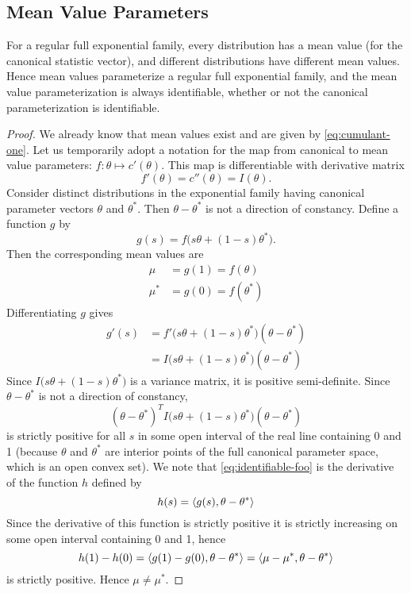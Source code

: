\subsection{Mean Value Parameters}
\label{sec:mean-value-parameterization}

\begin{theorem} \label{th:mean-value}
For a regular full exponential family, every distribution has a mean
value (for the canonical statistic vector), and different distributions
have different mean values.  Hence mean values parameterize a regular
full exponential family, and the mean value parameterization is always
identifiable, whether or not the canonical parameterization is identifiable.
\end{theorem}
\begin{proof}
We already know that mean values exist and are given by \eqref{eq:cumulant-one}.
Let us temporarily adopt a notation for the map from canonical to mean value
parameters: $f : \theta \mapsto c'(\theta)$.
This map is differentiable with derivative matrix
$$
   f'(\theta) = c''(\theta) = I(\theta).
$$
Consider distinct distributions in the exponential family having
canonical parameter vectors $\theta$ and $\theta^*$.
Then $\theta - \theta^*$ is not a direction of constancy.
Define a function $g$ by
$$
   g(s) = f\bigl(s \theta + (1 - s) \theta^*\bigr).
$$
Then the corresponding mean values are
\begin{align*}
   \mu & = g(1) = f(\theta)
   \\
   \mu^* & = g(0) = f(\theta^*)
\end{align*}
Differentiating $g$ gives
\begin{align*}
   g'(s)
   & =
   f'\bigl(s \theta + (1 - s) \theta^*\bigr) (\theta - \theta^*)
   \\
   & =
   I\bigl(s \theta + (1 - s) \theta^*\bigr) (\theta - \theta^*)
\end{align*}
Since $I\bigl(s \theta + (1 - s) \theta^*\bigr)$ is a variance matrix,
it is positive semi-definite.
Since $\theta - \theta^*$ is not a direction of constancy,
\begin{equation} \label{eq:identifiable-foo}
   (\theta - \theta^*)^T
   I\bigl(s \theta + (1 - s) \theta^*\bigr) (\theta - \theta^*)
\end{equation}
is strictly positive for all $s$ in some open interval of the real line
containing 0 and 1 (because $\theta$ and $\theta^*$ are interior points
of the full canonical parameter space, which is an open convex set).
We note that \eqref{eq:identifiable-foo} is the
derivative of the function $h$ defined by
$$
   h(s) = \langle g(s), \theta - \theta^* \rangle
$$
Since the derivative of this function is strictly positive it is strictly
increasing on some open interval containing 0 and 1, hence
$$
   h(1) - h(0) = \langle g(1) - g(0), \theta - \theta^* \rangle
   = \langle \mu - \mu^*, \theta - \theta^* \rangle
$$
is strictly positive.  Hence $\mu \neq \mu^*$.
\end{proof}


